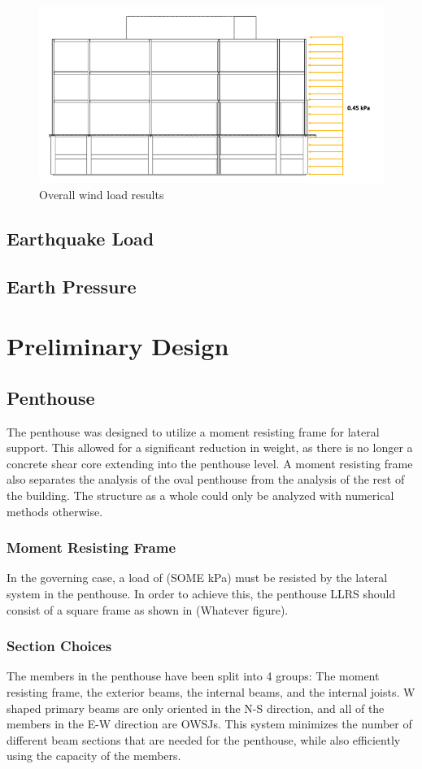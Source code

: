 \documentclass[12pt]{article}
\begin{document}
\begin{figure}[h!]
    \includegraphics[width=\linewidth]{Assets/windload.png}
    \caption{Overall wind load results}
    \label{fig:windload}
\end{figure}

\subsection{Earthquake Load}
\subsection{Earth Pressure}
\section{Preliminary Design}
\subsection{Penthouse}
The penthouse was designed to utilize a moment resisting frame for lateral support. 
This allowed for a significant reduction in weight, as there is no longer a concrete shear core extending into the penthouse level. 
A moment resisting frame also separates the analysis of the oval penthouse from the analysis of the rest of the building. 
The structure as a whole could only be analyzed with numerical methods otherwise.
\subsubsection{Moment Resisting Frame}
In the governing case, a load of (SOME kPa) must be resisted by the lateral system in the penthouse. 
In order to achieve this, the penthouse LLRS should consist of a square frame as shown in (Whatever figure). 
\subsubsection{Section Choices}
The members in the penthouse have been split into 4 groups: The moment resisting frame, the exterior beams, the internal beams, and the internal joists. 
W shaped primary beams are only oriented in the N-S direction, and all of the members in the E-W direction are OWSJs. 
This system minimizes the number of different beam sections that are needed for the penthouse, while also efficiently using the capacity of the members. 

\end{document}

